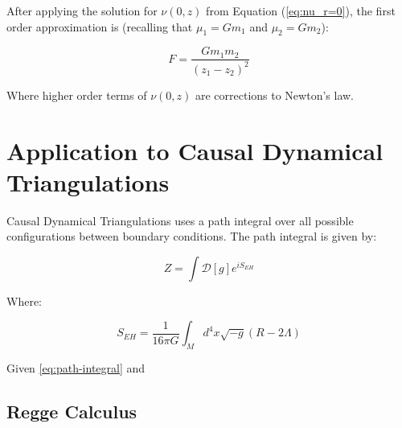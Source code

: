 \documentclass{article}
\begin{document}
After applying the solution for $\nu(0,z)$ from Equation (\ref{eq:nu_r=0}), the first order approximation is (recalling that $\mu_{1}=Gm_{1}$ and $\mu_{2}=Gm_{2}$):

\begin{equation}
F=\frac{Gm_{1}m_{2}}{\left(z_{1}-z_{2}\right)^{2}}
\end{equation}

Where higher order terms of $\nu\left(0,z\right)$ are corrections to Newton's law.

\section{Application to Causal Dynamical Triangulations}

Causal Dynamical Triangulations uses a path integral over all possible
configurations between boundary conditions. The path integral is given
by:

\begin{equation}
  \label{eq:path-integral}
Z=\int \mathcal{D}[g]e^{iS_ {EH}}
\end{equation}

Where:

\begin{equation}
  \label{eq:einstein-hilbert-action}
  S_{EH}=\frac{1}{16\pi G}\int_{M}d^4 x\sqrt{-g}\left(R-2\Lambda\right)
\end{equation}

Given \eqref{eq:path-integral} and \cite{kommu2011} 

\subsection{Regge Calculus}





\end{document}
